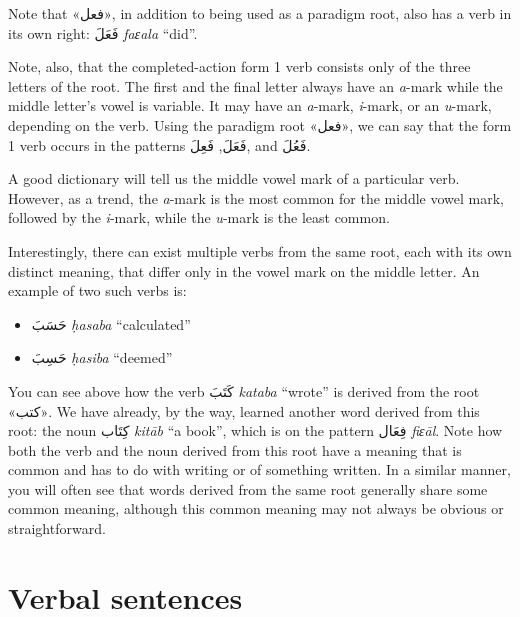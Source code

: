 \documentclass[
  10pt,
]{book}
\providecommand{\tightlist}{%
  \setlength{\itemsep}{0pt}\setlength{\parskip}{0pt}}
\begin{document}
Note that \foreignlanguage{arabic}{«فعل»}, in addition to being used as a paradigm root, also has a verb in its own right: \foreignlanguage{arabic}{فَعَلَ} \emph{faɛala} \enquote{did}.

Note, also, that the completed-action form 1 verb consists only of the three letters of the root. The first and the final letter always have an \emph{a}-mark while the middle letter's vowel is variable. It may have an \emph{a}-mark, \emph{i}-mark, or an \emph{u}-mark, depending on the verb. Using the paradigm root \foreignlanguage{arabic}{«فعل»}, we can say that the form 1 verb occurs in the patterns \foreignlanguage{arabic}{فَعَلَ}, \foreignlanguage{arabic}{فَعِلَ}, and \foreignlanguage{arabic}{فَعُلَ}.

A good dictionary will tell us the middle vowel mark of a particular verb. However, as a trend, the \emph{a}-mark is the most common for the middle vowel mark, followed by the \emph{i}-mark, while the \emph{u}-mark is the least common.

Interestingly, there can exist multiple verbs from the same root, each with its own distinct meaning, that differ only in the vowel mark on the middle letter. An example of two such verbs is:

\begin{itemize}
\tightlist
\item
  \foreignlanguage{arabic}{حَسَبَ} \emph{ḥasaba} \enquote{calculated}
\item
  \foreignlanguage{arabic}{حَسِبَ} \emph{ḥasiba} \enquote{deemed}
\end{itemize}

You can see above how the verb \foreignlanguage{arabic}{کَتَبَ} \emph{kataba} \enquote{wrote} is derived from the root \foreignlanguage{arabic}{«کتب»}. We have already, by the way, learned another word derived from this root: the noun \foreignlanguage{arabic}{کِتَاب} \emph{kitāb} \enquote{a book}, which is on the pattern \foreignlanguage{arabic}{فِعَال} \emph{fiɛāl}. Note how both the verb and the noun derived from this root have a meaning that is common and has to do with writing or of something written.
In a similar manner, you will often see that words derived from the same root generally share some common meaning, although this common meaning may not always be obvious or straightforward.

\section{Verbal sentences}\label{verbal-sentences}
\end{document}

